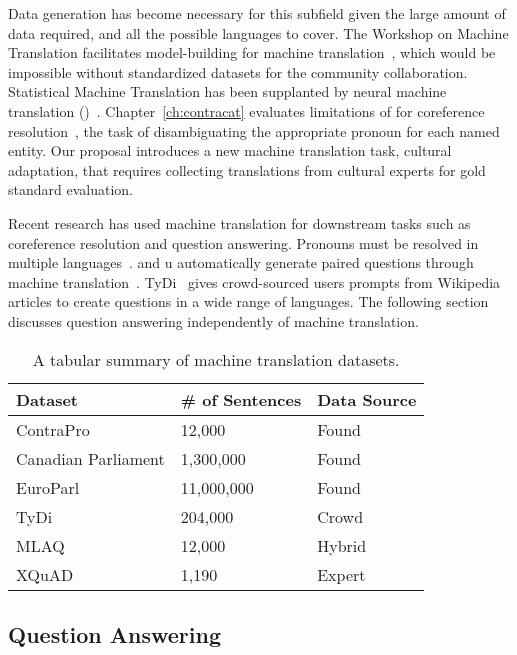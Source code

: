 Data generation has become necessary for this subfield given the large amount of data required, and all the possible languages to cover.
%
The Workshop on Machine Translation facilitates model-building for machine translation~\citep{koehn2006manual}, which would be impossible without standardized datasets for the community collaboration.  
%
Statistical Machine Translation has been supplanted by neural machine translation ()~\citep{wu2016google}.  
%
Chapter~\ref{ch:contracat} evaluates limitations of  for coreference resolution~\citep{soon2001machine}, the task of disambiguating  the appropriate pronoun for each named entity.  
%
Our proposal introduces a new machine translation task, cultural adaptation, that requires collecting translations from cultural experts for gold standard evaluation.  

Recent research has used machine translation for downstream tasks such  as coreference resolution and question answering.  
%
Pronouns must be resolved in multiple languages~\citep{muller2018large}.
%
 and u automatically generate paired questions through machine translation~\citep{lewis2019mlqa, 2019xquad}.
%
TyDi~\citep{tydiqa} gives crowd-sourced users prompts from Wikipedia articles to create questions in a wide range of languages.  
%
The following section discusses question answering independently of machine translation.  

\begin{table}
	\centering{}
	\begin{tabular}{l l l}
		\textbf{Dataset} &	\textbf{\# of Sentences} & \textbf{Data Source}\\
		\hline
		ContraPro & 12,000 & Found \\
		Canadian Parliament & 1,300,000 & Found \\
		EuroParl & 11,000,000 &  Found \\
		TyDi & 204,000 & Crowd \\
		MLAQ & 12,000 & Hybrid \\
		XQuAD & 1,190 & Expert \\
	\end{tabular}
	\caption{A tabular summary of machine translation datasets.}
	\label{tab:mt}
\end{table}

\subsection{Question Answering}
\label{sec:qa}

